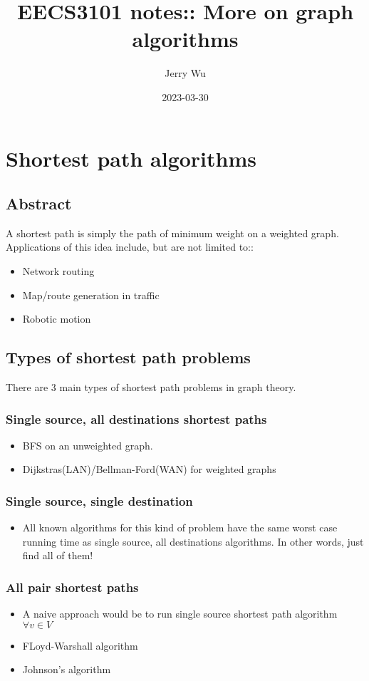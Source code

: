 \documentclass[12pt]{book}
\title{EECS3101 notes:: More on graph algorithms}
\author{Jerry Wu}
\date{2023-03-30}
\begin{document}
\maketitle
\chapter*{Shortest path algorithms}

\section*{Abstract}
A shortest path is simply the path of minimum weight on a weighted graph. Applications of this idea include, but are not limited to::
\begin{itemize}
    \item Network routing
    \item Map/route generation in traffic
    \item Robotic motion
\end{itemize}
\section*{Types of shortest path problems}
There are 3 main types of shortest path problems in graph theory.
\subsection*{Single source, all destinations shortest paths}
\begin{itemize}
    \item BFS on an unweighted graph.
    \item Dijkstras(LAN)/Bellman-Ford(WAN) for weighted graphs
\end{itemize}
\subsection*{Single source, single destination}
\begin{itemize}
    \item All known algorithms for this kind of problem have the same worst case running time as single source, all destinations algorithms. In other words, just find all of them!
\end{itemize}
\subsection*{All pair shortest paths}
\begin{itemize}
    \item A naive approach would be to run single source shortest path algorithm $\forall v\in V$
    \item FLoyd-Warshall algorithm
    \item Johnson's algorithm
\end{itemize}
\end{document}
